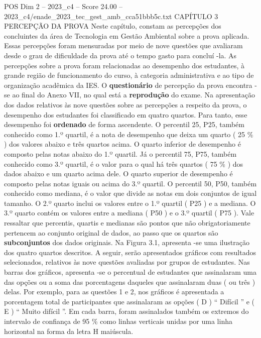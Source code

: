 \begin{textsample}{POS Dim 2 – 2023\_c4 – Score 24.00 – 2023\_c4/enade\_2023\_tec\_gest\_amb\_cca51bbb5c.txt}  \label{ex:f2_pos_018}
CAPÍTULO 3 PERCEPÇÃO DA PROVA Neste capítulo, constam as percepções dos concluintes da área de Tecnologia em Gestão Ambiental sobre a prova aplicada.
Essas percepções foram mensuradas por meio de nove questões que avaliaram desde o grau de dificuldade da prova até o tempo gasto para concluí -la.
As percepções sobre a prova foram relacionadas ao desempenho dos estudantes, à grande região de funcionamento do curso, à categoria administrativa e ao tipo de organização acadêmica da IES.
O \textbf{questionário} de percepção da prova encontra -se ao final do Anexo VII, no qual está a \textbf{reprodução} do exame.
Na apresentação dos dados relativos às nove questões sobre as percepções a respeito da prova, o desempenho dos estudantes foi classificado em quatro quartos.
Para tanto, esse desempenho foi \textbf{ordenado} de forma ascendente.
O percentil 25, P25, também conhecido como 1.º quartil, é a nota de desempenho que deixa um quarto ( 25 \% ) dos valores abaixo e três quartos acima.
O quarto inferior de desempenho é composto pelas notas abaixo do 1.º quartil.
Já o percentil 75, P75, também conhecido como 3.º quartil, é o valor para o qual há três quartos ( 75 \% ) dos dados abaixo e um quarto acima dele.
O quarto superior de desempenho é composto pelas notas iguais ou acima do 3.º quartil.
O percentil 50, P50, também conhecido como mediana, é o valor que divide as notas em dois conjuntos de igual tamanho.
O 2.º quarto inclui os valores entre o 1.º quartil ( P25 ) e a mediana.
O 3.º quarto contém os valores entre a mediana ( P50 ) e o 3.º quartil ( P75 ).
Vale ressaltar que percentis, quartis e medianas são pontos que não obrigatoriamente pertencem ao conjunto original de dados, ao passo que os quartos são \textbf{subconjuntos} dos dados originais.
Na Figura 3.1, apresenta -se uma ilustração dos quatro quartos descritos.
A seguir, serão apresentados gráficos com resultados selecionados, relativos às nove questões avaliadas por grupos de estudantes.
Nas barras dos gráficos, apresenta -se o percentual de estudantes que assinalaram uma das opções ou a soma das porcentagens daqueles que assinalaram duas ( ou três ) delas.
Por exemplo, para as questões 1 e 2, nos gráficos é apresentada a porcentagem total de participantes que assinalaram as opções ( D ) “ Difícil ” e ( E ) “ Muito difícil ”.
Em cada barra, foram assinalados também os extremos do intervalo de confiança de 95 \% como linhas verticais unidas por uma linha horizontal na forma da letra H maiúscula.

\end{textsample}
